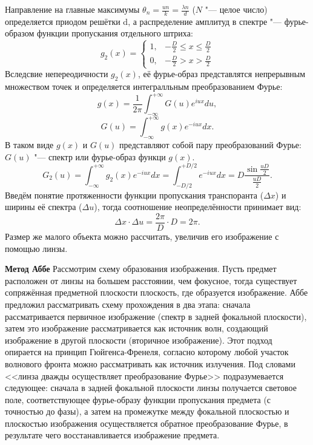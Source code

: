 \documentclass[10pt, a4paper]{article}
\begin{document}
Направление на главные максимумы $\theta_n = \frac{u n}{k} = \frac{\lambda n}{d}$ ($N$ "--- целое число) определяется приодом решётки d, а распределение амплитуд в спектре "--- фурье-образом функции пропускания отдельного штриха:
\[
g_2 (x) = \begin{cases} 1, & - \frac{D}{2} \leq x \leq \frac{D}{2} \\
						0, & - \frac{D}{2} > x > \frac{D}{2}
\end{cases}
\]
Вследсвие непереодичности $g_2(x)$, её фурье-образ представлятся непрерывным множеством точек и определяется интегралльным преобразованием Фурье:
\[
g(x) = \frac{1}{2 \pi} \int_{-\infty}^{+\infty} G(u) e^{iux} du,
\]
\[
G(u) = \int_{-\infty}^{+\infty} g(x) e^{-iux}dx.
\]
В таком виде $g(x)$ и $G(u)$ представляют собой пару преобразований Фурье: $G(u)$ "--- спектр или фурье-образ функци $g(x)$.
\[
	G_2 (u) = \int_{-\infty}^{+\infty} g_2 (x) e^{-iux} dx  = \int_{-D/2}^{+D/2} e^{-iux} dx = D \frac{\sin \frac{uD}{2}}{\frac{uD}{2}}.
\]
Введём понятие протяженности функции пропускания транспоранта ($\Delta x$) и ширины её спектра ($\Delta u$), тогда соотношение неопределённости принимает вид:
\[
	\Delta x \cdot \Delta u = \frac{2 \pi}{D} \cdot D = 2 \pi.
\]
Размер же малого объекта можно рассчитать, увеличив его изображение с помощью линзы.

\textbf{Метод Аббе}
Рассмотрим схему образования изображения. Пусть предмет расположен от линзы на большем расстоянии, чем фокусное, тогда существует сопряжённая предметной плоскости плоскость, где образуется изображение. Аббе предложил рассматривать схему прохождения в два этапа: сначала рассматривается первичное изображение (спектр в задней фокальной плоскости), затем это изображение рассматривается как источник волн, создающий изображение в другой плоскости (вторичное изображение). Этот подход опирается на принцип Гюйгенса-Френеля, согласно которому любой участок волнового фронта можно рассматривать как источник излучения. Под словами <<линза дважды осуществляет преобразование Фурье>> подразумевается следующее: сначала в задней фокальной плоскости линзы получается световое поле, соответствующее фурье-образу функции пропускания предмета (с точностью до фазы), а затем на промежутке между фокальной плоскостью и плоскостью изображения осуществляется обратное преобразование Фурье, в результате чего восстанавливается изображение предмета.
\end{document}
